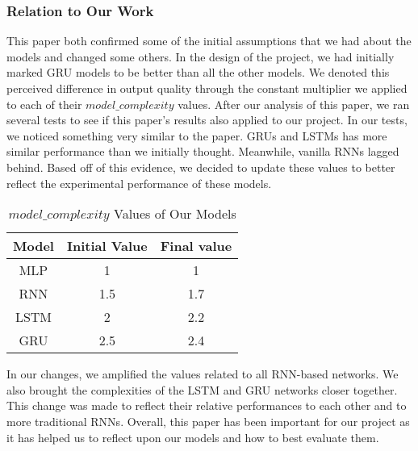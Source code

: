 \documentclass{article}
\begin{document}
    \subsubsection*{Relation to Our Work}

    This paper both confirmed some of the initial assumptions that we had about the models and changed some others.
    In the design of the project, we had initially marked GRU models to be better than all the other models.
    We denoted this perceived difference in output quality through the constant multiplier we applied to each of their
    $model\_complexity$ values.  After our analysis of this paper, we ran several tests to see if this paper's results
    also applied to our project.  In our tests, we noticed something very similar to the paper.  GRUs and LSTMs
    has more similar performance than we initially thought.  Meanwhile, vanilla RNNs lagged behind.  Based off of
    this evidence, we decided to update these values to better reflect the experimental performance of these models.

    \begin{table}[h!]
        \begin{center}
            \caption{$model\_complexity$ Values of Our Models}
            \label{tab:modelComplexity}
            \begin{tabular}{c|c|c}
                \textbf{Model} & \textbf{Initial Value} & \textbf{Final value}\\
                \hline
                MLP & 1 & 1\\
                RNN & 1.5 & 1.7\\
                LSTM & 2 & 2.2\\
                GRU & 2.5 & 2.4
            \end{tabular}
        \end{center}
    \end{table}

    In our changes, we amplified the values related to all RNN-based networks.  We also brought the complexities
    of the LSTM and GRU networks closer together.  This change was made to reflect their relative performances to
    each other and to more traditional RNNs.  Overall, this paper has been important for our project as it has
    helped us to reflect upon our models and how to best evaluate them.


    \pagebreak
    
    
\end{document}
